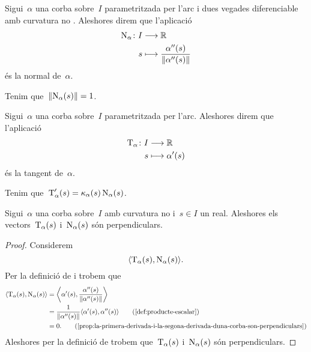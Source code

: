 \documentclass[../../main.tex]{subfiles}
\begin{document}
    \begin{definition}[Normal]
        \label{def:normal}
        Sigui~\(\alpha\) una corba sobre~\(I\) parametritzada per l'arc i dues vegades diferenciable amb curvatura no \nulla{}.
        Aleshores direm que l'aplicació
        \begin{align*}
            \normal_{\alpha}\colon I&\longrightarrow\mathbb{R} \\
            s&\longmapsto\frac{\alpha''(s)}{\norm{\alpha''(s)}}
        \end{align*}
        és la normal de~\(\alpha\).
    \end{definition}
    \begin{observation}
        \label{obs:la-normal-a-una-corba-es-unitaria}
        Tenim que~\(\norm{\normal_{\alpha}(s)}=1\).
    \end{observation}
    \begin{definition}[Tangent]
        \label{def:tangent}
        Sigui~\(\alpha\) una corba sobre~\(I\) parametritzada per l'arc.
        Aleshores direm que l'aplicació
        \begin{align*}
            \operatorname{T}_{\alpha}\colon I&\longrightarrow\mathbb{R} \\
            s&\longmapsto\alpha'(s)
        \end{align*}
        és la tangent de~\(\alpha\).
    \end{definition}
    \begin{observation}
        \label{obs:la-derivada-de-la-tangent-es-la-curvatura-per-la-normal}
        Tenim que~\(\operatorname{T}_{\alpha}'(s)=\operatorname{\kappa}_{\alpha}(s)\operatorname{N}_{\alpha}(s)\).
    \end{observation}
    \begin{proposition}
        \label{prop:la-tangent-i-la-normal-duna-corba-amb-curvatura-no-nula-son-perpendiculars}
        Sigui~\(\alpha\) una corba sobre~\(I\) amb curvatura no \nulla{} i~\(s\in I\) un real.
        Aleshores els vectors~\(\operatorname{T}_{\alpha}(s)\) i~\(\operatorname{N}_{\alpha}(s)\) són perpendiculars.
    \end{proposition}
    \begin{proof}
        Considerem
        \[
            \prodesc{\tangent_{\alpha}(s)}{\normal_{\alpha}(s)}.
        \]
        Per la definició de  i  trobem que
        \begin{align*}
            \prodesc{\tangent_{\alpha}(s)}{\normal_{\alpha}(s)}&=\prodesc[\bigg]{\alpha'(s)}{\frac{\alpha''(s)}{\norm{\alpha''(s)}}} \\
            &=\frac{1}{\norm{\alpha''(s)}}\prodesc{\alpha'(s)}{\alpha''(s)} \tag{\ref{def:producte-escalar}} \\
            &=0.
            \tag{\ref{prop:la-primera-derivada-i-la-segona-derivada-duna-corba-son-perpendiculars}}
        \end{align*}
        Aleshores per la definició de  trobem que~\(\operatorname{T}_{\alpha}(s)\) i~\(\operatorname{N}_{\alpha}(s)\) són perpendiculars.
    \end{proof}
\end{document}
